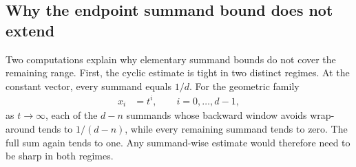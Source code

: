 \documentclass{article}
\begin{document}
\subsection{Why the endpoint summand bound does not extend}

Two computations explain why elementary summand bounds do not cover the
remaining range. First, the cyclic estimate is tight in two distinct regimes.
At the constant vector, every summand equals $1/d$. For the geometric family
\begin{align}
    x_i
        &=t^i,
    \qquad i=0,\ldots,d-1,
    \label{eq:wolf_ex3_1_choi_positivity_subcase_scope_geometric_family}
\end{align}
as $t\to\infty$, each of the $d-n$ summands whose backward window avoids
wrap-around tends to $1/(d-n)$, while every remaining summand tends to zero.
The full sum again tends to one. Any summand-wise estimate would therefore
need to be sharp in both regimes.
\end{document}
